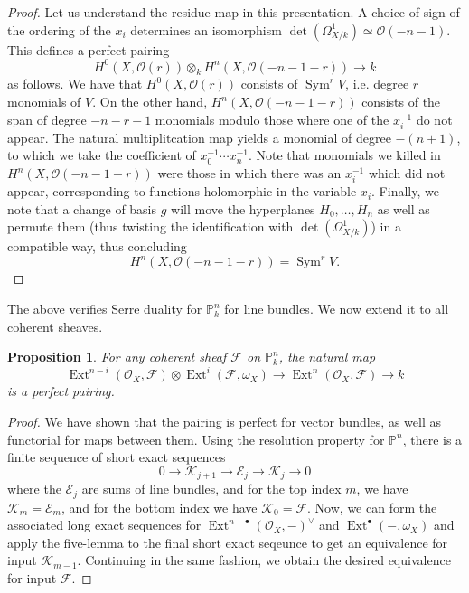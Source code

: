 \documentclass[10pt]{article}
\newtheorem{prop}[thm]{Proposition}
\theoremstyle{definition}
\DeclareMathOperator{\Ext}{Ext}
\DeclareMathOperator{\Sym}{Sym}
\newcommand{\PP}{\mathbb{P}}
\newcommand{\OO}{\mathcal{O}}
\begin{document}
\begin{proof}
Let us understand the residue map in this presentation.  A choice of sign of the ordering of the $x_i$ determines an isomorphism $\det(\Omega^1_{X/k}) \simeq \OO(-n-1)$.  %
This defines a perfect pairing
$$H^0(X, \OO(r)) \otimes_k H^n(X, \OO(-n-1-r)) \rightarrow k$$
as follows.  We have that $H^0(X, \OO(r))$ consists of $\Sym^r V$, i.e. degree $r$ monomials of $V$.  On the other hand, $H^n(X, \OO(-n-1-r))$ consists of the span of degree $-n-r-1$ monomials modulo those where one of the $x_i^{-1}$ do not appear.  The natural multiplitcation map yields a monomial of degree $-(n+1)$, to which we take the coefficient of $x_0^{-1} \cdots x_n^{-1}$.  Note that monomials we killed in $H^n(X, \OO(-n-1-r))$ were those in which there was an $x_i^{-1}$ which did not appear, corresponding to functions holomorphic in the variable $x_i$.  Finally, we note that a change of basis $g$ will move the hyperplanes $H_0, \ldots, H_n$ as well as permute them (thus twisting the identification with $\det(\Omega^1_{X/k})$) in a compatible way, thus concluding
$$H^n(X, \OO(-n-1-r)) = \Sym^r V.$$
\end{proof}

The above verifies Serre duality for $\PP^n_k$ for line bundles.  We now extend it to all coherent sheaves.
\begin{prop}
For any coherent sheaf $\mathcal{F}$ on $\PP^n_k$, the natural map
$$\Ext^{n-i}(\OO_X, \mathcal{F}) \otimes \Ext^i(\mathcal{F}, \omega_X) \rightarrow \Ext^n(\OO_X, \mathcal{F}) \rightarrow k$$
is a perfect pairing.
\end{prop}
\begin{proof}
We have shown that the pairing is perfect for vector bundles, as well as functorial for maps between them.  Using the resolution property for $\PP^n$, there is a finite sequence of short exact sequences
$$0 \rightarrow \mathcal{K}_{j+1} \rightarrow \mathcal{E}_j \rightarrow \mathcal{K}_j \rightarrow 0$$
where the $\mathcal{E}_j$ are sums of line bundles, and for the top index $m$, we have $\mathcal{K}_{m} = \mathcal{E}_{m}$, and for the bottom index we have $\mathcal{K}_0 = \mathcal{F}$.  Now, we can form the associated long exact sequences for $\Ext^{n - \bullet}(\OO_X, -)^\vee$ and $\Ext^\bullet(-, \omega_X)$ and apply the five-lemma to the final short exact seqeunce to get an equivalence for input $\mathcal{K}_{m-1}$.  Continuing in the same fashion, we obtain the desired equivalence for input $\mathcal{F}$.
\end{proof}
\end{document}
